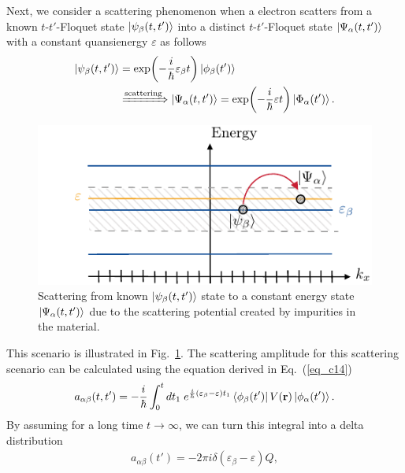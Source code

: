 Next, we consider a scattering phenomenon when a electron scatters from a known $t$-$t'$-Floquet state $\ket{\psi_{\beta}(t,t')} $ into a distinct $t$-$t'$-Floquet state $\ket{\Psi_{\alpha}(t,t')}$ with a constant quansienergy $\varepsilon$ as follows
\begin{equation} \label{eq_c15}
  \begin{aligned}
  \ket{\psi_{\beta}(t,t')} &= \exp(-\frac{i}{\hbar}\varepsilon_{\beta} t)
  \ket{\phi_{\beta}(t')} \\
  &
  \xRightarrow{\text{scattering}}
  \ket{\Psi_{\alpha}(t,t')} = \exp(-\frac{i}{\hbar}\varepsilon t)
  \ket{\Phi_{\alpha}(t')}.
  \end{aligned}
\end{equation}
\begin{figure}[b]
  \includegraphics[scale=1.0]{figures/fig_2.pdf}
  \caption{Scattering from known $\ket{\psi_{\beta}(t,t')}$ state to a constant energy state $\ket{\Psi_{\alpha}(t,t')}$ due to the scattering potential created by impurities in the material.}
  \label{fig_2}
\end{figure}
This scenario is illustrated in Fig.~\ref{fig_2}.
The scattering amplitude for this scattering scenario can be calculated using the equation derived in Eq.~(\ref{eq_c14})
\begin{equation} \label{eq_c16}
  \begin{aligned}
    a_{\alpha\beta}(t,t') =
    -\frac{i}{\hbar}
    \int_{0}^t dt_1 \;
    e^{\frac{i}{\hbar}\qty(\varepsilon_{\beta} - \varepsilon)t_1}
    \bra{\phi_{\beta}(t')}
    V(\vb{r}) \ket{\phi_{\alpha}(t')}.
  \end{aligned}
\end{equation}
By assuming for a long time $t \rightarrow \infty$, we can turn this integral into a delta distribution
\begin{equation} \label{eq_c17}
  \begin{aligned}
    a_{\alpha\beta}(t') =
    -2\pi i \delta(\varepsilon_{\beta} - \varepsilon)Q,
  \end{aligned}
\end{equation}
